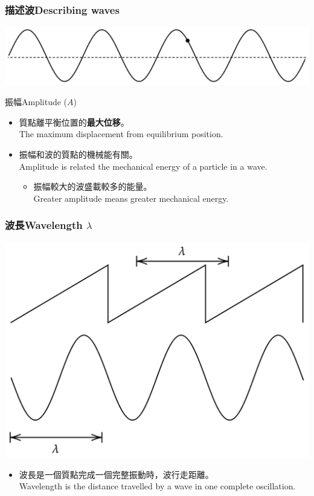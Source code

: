 \documentclass[beamer=true]{standalone}
\begin{document}
\begin{frame}
    \frametitle{描述波Describing waves}
    \par{\par\centering\includegraphics[width=.75\textwidth]{./img/ch1_2024-05-06-20-43-46.png}\par}
    \begin{block}{振幅Amplitude ($A$)}
        \begin{itemize}
            \item 質點離平衡位置的\textbf{最大位移}。\\The maximum displacement from equilibrium position.
            \item 振幅和波的質點的機械能有關。\\Amplitude is related the mechanical energy of a particle in a wave.
                  \begin{itemize}
                      \item 振幅較大的波盛載較多的能量。\\Greater amplitude means greater mechanical energy.
                  \end{itemize}
        \end{itemize}
    \end{block}
\end{frame}

\begin{frame}
    \frametitle{波長Wavelength $\lambda$}

    \par{\par\centering\includegraphics[width=.6\textwidth]{./img/ch1_2024-05-06-21-13-45.png}\par}

    \begin{itemize}
        \item 波長是一個質點完成一個完整振動時，波行走距離。\\Wavelength is the distance travelled by a wave in one complete oscillation.
    \end{itemize}
\end{frame}
\end{document}
